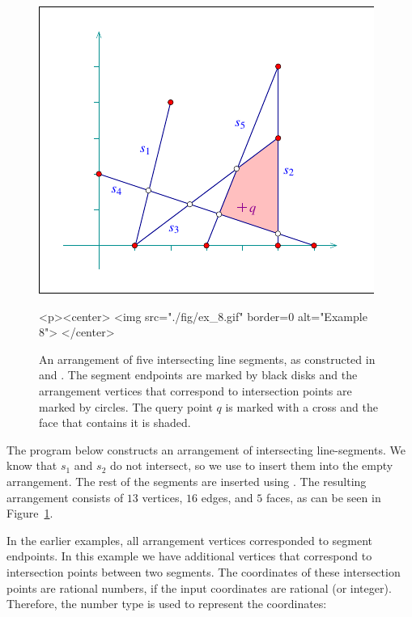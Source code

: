 \begin{figure}[t]
\begin{ccTexOnly}
  \begin{center}
  \includegraphics{Arrangement_on_surface_2/fig/ex_8}
  \end{center}
\end{ccTexOnly}
\begin{ccHtmlOnly}
  <p><center>
  <img src="./fig/ex_8.gif" border=0 alt="Example 8">
  </center>
\end{ccHtmlOnly}
\caption{An arrangement of five intersecting line segments, as
constructed in  and
. The segment
endpoints are marked by black disks and the arrangement vertices
that correspond to intersection points are marked by circles.
The query point $q$ is marked with a cross and the face that
contains it is shaded.\label{arr_fig:ex_8}}
\end{figure}

The program below constructs an arrangement of intersecting
line-segments. We know that $s_1$ and $s_2$ do not intersect, so
we use  to insert them into the
empty arrangement. The rest of the segments are inserted using
. The resulting arrangement consists
of $13$ vertices, $16$ edges, and $5$ faces, as can be seen in
Figure~\ref{arr_fig:ex_8}.

In the earlier examples, all arrangement vertices corresponded to
segment endpoints. In this example we have additional vertices that
correspond to intersection points between two segments. The
coordinates of these intersection points are rational numbers, if
the input coordinates are rational (or integer). Therefore,
the  number type is used to represent the
coordinates:

